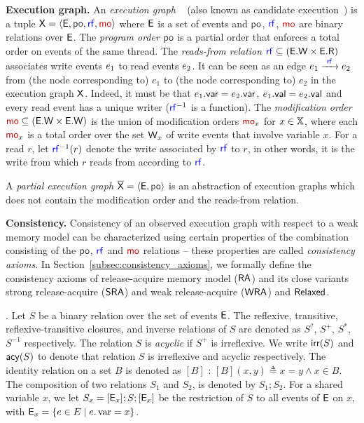 \noindent \textbf{Execution graph.} An \emph{execution graph} ~\cite{Lahav:2017} (also known as candidate execution~\cite{Batty:2011}) is a tuple $\ex = \tup{\E, \po, \rf, \mo}$  where $\mathsf{E}$ is a set of events and $\po$, $\rf$, $\mo$ are binary relations over $\mathsf{E}$. 
The \emph{program order} $\po$ is a partial order that enforces a total order on events of the same thread. 
The \emph{reads-from relation} $\rf\subseteq (\E.\W \times \E.\R)$ associates write
 events $e_1$ to read events $e_2$. It can be seen as an edge $e_1 \xra{~\rf~} e_2$ from (the node corresponding to) $e_1$ to (the node corresponding to) $e_2$ in the execution graph $\mathsf{\color{black}X}$. 
Indeed, it must be that $e_1.\mathsf{var}=e_2.\mathsf{var}$, $e_1.\mathsf{val}=  e_2.\mathsf{val}$ and every read event has a unique writer ($\rfinv$ is a function). 
The \emph{modification order} $\mo\subseteq (\E.\W\times \E.\W)$ is the union of modification orders $\mo_x$ for $x \in {\mathbb X}$, where each $\mo_x$ is a total order over the set ${{\mathsf{W}}_{x}}$ of write events that involve variable $x$. For a read $r$, let $\rf^{-1}(r)$ denote the write associated by $\rf$ to $r$, in other words, it is the write from which $r$ reads from according to $\rf$.

A \emph{partial execution graph} $\expartial=\tup{\E, \po}$ is an abstraction of execution graphs which does not contain the modification order and the reads-from relation.

\noindent \textbf{Consistency.} Consistency of an observed execution graph with respect to a weak memory model can be characterized using certain properties of the combination consisting of the $\po$, $\rf$ and $\mo$ relations -- these properties are called \emph{consistency axioms}. In Section~\ref{subsec:consistency_axioms}, we formally define the consistency axioms of release-acquire memory model ($\mathsf{RA}$) and its close variants strong release-acquire ($\mathsf{SRA}$) and weak release-acquire ($\mathsf{WRA}$) and $\mathsf{Relaxed}$. 

. 
Let $S$ be a binary relation over the set of events $\mathsf{E}$.  The reflexive, transitive, reflexive-transitive closures, and inverse relations of $S$ 
are denoted as $S^?$, $S^+$, $S^*$, $S^{-1}$ respectively. 
The relation $S$ is \emph{acyclic} if $S^+$ is irreflexive. 
We write $\mathsf{irr}(S)$ and $\mathsf{acy}(S)$ to denote that  relation $S$ is irreflexive and acyclic respectively.  The identity relation on a set $B$ is denoted as $[B]$ : 
$[B](x,y) \triangleq x = y \land x \in B$.
The composition of two relations $S_1$ and $S_2$, is denoted by $S_1;S_2$. 
For a shared variable $x$, we let $S_x=[{{\mathsf{E}}_{x}}];S;[{{\mathsf{E}}_{x}}]$ be the restriction of $S$ to all events of $\mathsf{E}$ on $x$, with ${{\mathsf{E}}_{x}} = \{ e \in E \mid e.\operatorname{var} = x \}$.

